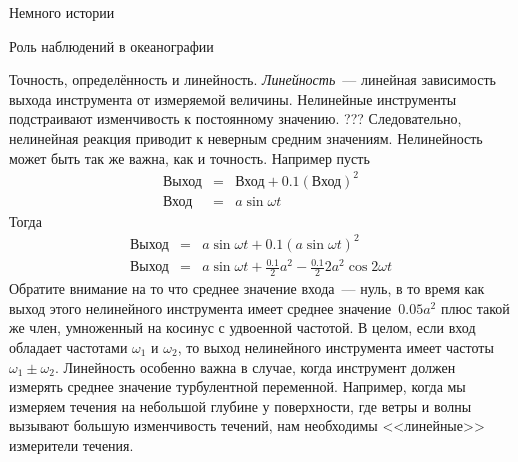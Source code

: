 \begin{chapter}{Немного истории}
\begin{section}{Роль наблюдений в океанографии}
\begin{paragraph}{Точность, определённость и линейность.}
\emph{Линейность}~--- линейная зависимость выхода инструмента от измеряемой
величины. Нелинейные инструменты подстраивают
изменчивость к постоянному значению. ??? Следовательно, нелинейная реакция
приводит к неверным средним значениям. Нелинейность может быть так же
важна, как и точность. Например пусть
\begin{eqnarray}
\mbox{Выход} & = & \mbox{Вход} + 0.1 (\mbox{Вход})^2 \\
\mbox{Вход}  & = & a \sin \omega t
\end{eqnarray}
Тогда
\begin{eqnarray}
\mbox{Выход} & = & a \sin \omega t + 0.1 (a \sin \omega t)^2 \\
\mbox{Выход} & = & a \sin \omega t + \frac{0.1}{2} a^2 - \frac{0.1}{2}2 a^2 \cos 2\omega t
\end{eqnarray}
Обратите внимание на то что среднее значение входа~--- нуль, в то
время как выход этого нелинейного инструмента имеет среднее значение~$0.05a^2$ 
плюс такой же член, умноженный на косинус с удвоенной
частотой. В целом, если вход обладает частотами $\omega_1$ и $\omega_2$, 
то выход нелинейного инструмента имеет частоты $\omega_1\pm \omega_2$. 
Линейность особенно важна в случае, когда инструмент должен измерять 
среднее значение турбулентной переменной. Например, когда мы измеряем течения 
на небольшой глубине у поверхности, где ветры и волны вызывают большую 
изменчивость течений, нам необходимы <<линейные>> измерители течения.
%
\end{paragraph}


\end{section}
\end{chapter}
